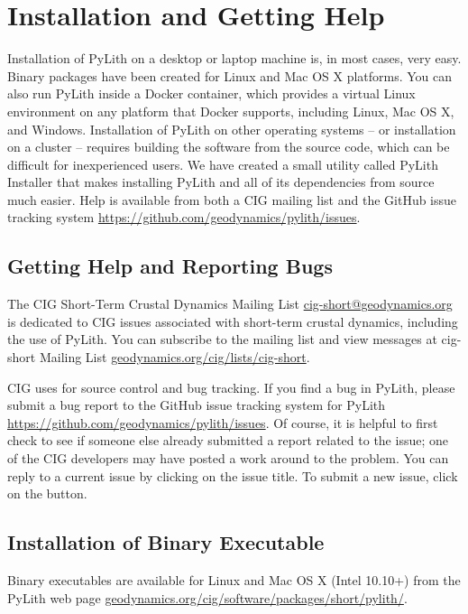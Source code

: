 \chapter{Installation and Getting Help}
\label{cha:installation}

Installation of PyLith on a desktop or laptop machine is, in most
cases, very easy. Binary packages have been created for Linux and Mac
OS X platforms. You can also run PyLith inside a Docker container,
which provides a virtual Linux environment on any platform that Docker
supports, including Linux, Mac OS X, and Windows. Installation of
PyLith on other operating systems -- or installation on a cluster --
requires building the software from the source code, which can be
difficult for inexperienced users. We have created a small utility
called PyLith Installer that makes installing PyLith and all of its
dependencies from source much easier. Help is available from both a
CIG mailing list and the GitHub issue tracking system
\url{https://github.com/geodynamics/pylith/issues}.


\section{Getting Help and Reporting Bugs}
\label{sec:help}

The CIG Short-Term Crustal Dynamics Mailing List
\url{cig-short@geodynamics.org} is dedicated to CIG issues associated
with short-term crustal dynamics, including the use of PyLith. You can
subscribe to the mailing list and view messages at cig-short Mailing
List \url{geodynamics.org/cig/lists/cig-short}.

CIG uses  for source control and bug tracking. If you
find a bug in PyLith, please submit a bug report to the GitHub issue
tracking system for PyLith \url{https://github.com/geodynamics/pylith/issues}.
Of course, it is helpful to first check to see if someone else already
submitted a report related to the issue; one of the CIG developers
may have posted a work around to the problem. You can reply to a current
issue by clicking on the issue title. To submit a new issue, click
on the  button.


\section{Installation of Binary Executable}

Binary executables are available for Linux and Mac OS X (Intel 10.10+)
from the PyLith web page
\url{geodynamics.org/cig/software/packages/short/pylith/}.

